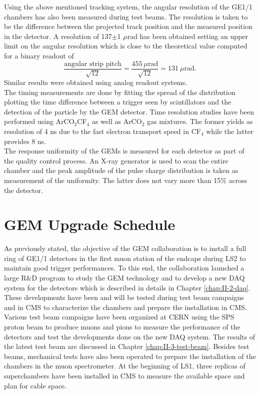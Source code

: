     Using the above mentioned tracking system, the angular resolution of the GE1/1 chambers has also been measured during test beams. The resolution is taken to be the difference between the projected track position and the measured position in the detector. A resolution of 137$\pm$1 $\mu$rad has been obtained setting an upper limit on the angular resolution which is close to the theoretical value computed for a binary readout of
    \begin{equation}
      \frac{\text{angular strip pitch}}{\sqrt{12}} = \frac{455\  \mu\text{rad}}{\sqrt{12}} = 131\ \mu\text{rad} .
    \end{equation}
    Similar results were obtained using analog readout systems. \\

    The timing measurements are done by fitting the spread of the distribution plotting the time difference between a trigger seen by scintillators and the detection of the particle by the GEM detector. Time resolution studies have been performed using ArCO$_2$CF$_4$ as well as ArCO$_2$ gas mixtures. The former yields as resolution of 4 ns due to the fast electron transport speed in CF$_4$ while the latter provides 8 ns. \\

    The response uniformity of the GEMs is measured for each detector as part of the quality control process. An X-ray generator is used to scan the entire chamber and the peak amplitude of the pulse charge distribution is taken as measurement of the uniformity. The latter does not vary more than 15\% across the detector.

  \section{GEM Upgrade Schedule}

    As previously stated, the objective of the GEM collaboration is to install a full ring of GE1/1 detectors in the first muon station of the endcaps during LS2 to maintain good trigger performances. To this end, the collaboration launched a large R\&D program to study the GEM technology and to develop a new DAQ system for the detectors which is described in details in Chapter \ref{chap:II-2-daq}. These developments have been and will be tested during test beam campaigns and in CMS to characterize the chambers and prepare the installation in CMS. \\

    Various test beam campaigns have been organized at CERN using the SPS proton beam to produce muons and pions to measure the performance of the detectors and test the developments done on the new DAQ system. The results of the latest test beam are discussed in Chapter \ref{chap:II-3-test-beam}. Besides test beams, mechanical tests have also been operated to prepare the installation of the chambers in the muon spectrometer. At the beginning of LS1, three replicas of superchambers have been installed in CMS to measure the available space and plan for cable space. \\

